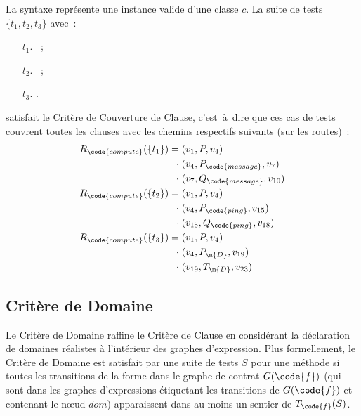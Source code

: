 \begin{example}

La syntaxe  représente une instance valide d'une classe $c$.
La suite de tests $\{t_1, t_2, t_3\}$ avec~:
%
\begin{itemize}

\item[$t_1.$]
%
~;

\item[$t_2.$]
%
~;

\item[$t_3.$]
%
.

\end{itemize}
%
satisfait le Critère de Couverture de Clause, c'est~à~dire que ces cas de tests
couvrent toutes les clauses avec les chemins respectifs suivants (sur les
routes)~:
%
\begin{align*}
%
R_\code{compute}(\{t_1\}) =\;
          & (v_1, P, v_4) \\
  \cdot\; & (v_4, P_\code{message}, v_7) \\
  \cdot\; & (v_7, Q_\code{message}, v_{10}) \\
%
R_\code{compute}(\{t_2\}) =\;
          & (v_1, P, v_4) \\
  \cdot\; & (v_4, P_\code{ping}, v_{15}) \\
  \cdot\; & (v_{15}, Q_\code{ping}, v_{18}) \\
%
R_\code{compute}(\{t_3\}) =\;
          & (v_1, P, v_4) \\
  \cdot\; & (v_4, P_\m{D}, v_{19}) \\
  \cdot\; & (v_{19}, T_\m{D}, v_{23})
%
\end{align*}

\end{example}

\subsection{Critère de Domaine}

Le Critère de Domaine raffine le Critère de Clause en considérant la déclaration
de domaines réalistes à l'intérieur des graphes d'expression. Plus formellement,
le Critère de Domaine est satisfait par une suite de tests $S$ pour une méthode
 si toutes les transitions de la forme  dans le graphe de
contrat $G(\code{f})$ (qui sont dans les graphes d'expressions étiquetant les
transitions de $G(\code{f})$ et contenant le nœud $\mathit{dom}$) apparaissent
dans au moins un sentier de $T_\code{f}(S)$.

